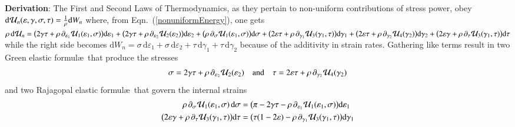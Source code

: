 \medskip\noindent
\textbf{Derivation}: The First and Second Laws of Thermo\-dynamics, as they pertain to non-uniform contributions of stress power, obey $\mathrm{d} \hspace{0.5pt} \mathcal{U}_n ( \varepsilon , \gamma , \sigma , \tau ) = \tfrac{1}{\rho} \mathrm{d} W_n$ where, from Eqn.~(\ref{nonuniformEnergy}), one gets $\rho \, \mathrm{d} \hspace{0.5pt} \mathcal{U}_n = \bigl( 2 \gamma \tau + \rho \, \partial_{\varepsilon_1} \hspace{0.5pt} \mathcal{U}_1 ( \varepsilon_1 , \sigma ) \bigr) \mathrm{d} \varepsilon_1 + \bigl( 2 \gamma \tau + \rho \, \partial_{\varepsilon_2} \hspace{0.5pt} \mathcal{U}_2 ( \varepsilon_2 ) \bigr) \mathrm{d} \varepsilon_2 + \bigl( \rho \, \partial_{\sigma} \hspace{0.5pt} \mathcal{U}_1 ( \varepsilon_1 , \sigma ) \bigr) \mathrm{d} \sigma + \bigl( 2 \varepsilon \tau + \rho \, \partial_{\gamma_1} \hspace{0.5pt} \mathcal{U}_3 ( \gamma_1 , \tau ) \bigr) \mathrm{d} \gamma_1 + \bigl( 2 \varepsilon \tau + \rho \, \partial_{\gamma_2} \hspace{0.5pt} \mathcal{U}_4 ( \gamma_2 ) \bigr) \mathrm{d} \gamma_2 + \bigl( 2 \varepsilon \gamma + \rho \, \partial_{\tau} \hspace{0.5pt} \mathcal{U}_3 ( \gamma_1 , \tau ) \bigr) \mathrm{d} \tau$ while the right side becomes $\mathrm{d}W_n = \sigma \, \mathrm{d} \varepsilon_1 + \sigma \, \mathrm{d} \varepsilon_2 + \tau \, \mathrm{d} \gamma_1 + \tau \, \mathrm{d} \gamma_2$ because of the additivity in strain rates.  Gathering like terms result in two Green elastic formul\ae\ that produce the stresses
\begin{displaymath}
\sigma = 2 \gamma \tau + \rho \, \partial_{\varepsilon_2} \hspace{0.5pt} \mathcal{U}_2 ( \varepsilon_2 ) 
\quad \text{and} \quad
\tau = 2 \varepsilon \tau + \rho \, \partial_{\gamma_2} \hspace{0.5pt} \mathcal{U}_4 ( \gamma_2 )
\end{displaymath}
and two Rajagopal elastic formul\ae\ that govern the internal strains
\begin{align*}
\rho \, \partial_{\sigma} \hspace{0.5pt} \mathcal{U}_1 ( \varepsilon_1 , \sigma ) \, \mathrm{d} \sigma & = \bigl( \pi - 2 \gamma \tau - \rho \, \partial_{\varepsilon_1} \hspace{0.5pt} \mathcal{U}_1 ( \varepsilon_1 , \sigma ) \bigr) \mathrm{d} \varepsilon_1 \\
\bigl( 2 \varepsilon \gamma + \rho \, \partial_{\tau} \hspace{0.5pt} \mathcal{U}_3 ( \gamma_1 , \tau ) \bigr) \mathrm{d} \tau & = \bigl( \tau ( 1 - 2 \varepsilon ) - \rho \, \partial_{\gamma_1} \hspace{0.5pt} \mathcal{U}_3 ( \gamma_1 , \tau ) \bigr) \mathrm{d} \gamma_1 
\end{align*}
